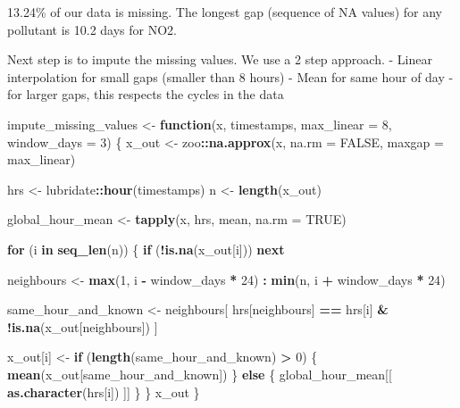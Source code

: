 \documentclass[
]{article}
\newenvironment{Shaded}{\begin{snugshade}}{\end{snugshade}}
\newcommand{\AttributeTok}[1]{\textcolor[rgb]{0.13,0.29,0.53}{#1}}
\newcommand{\ConstantTok}[1]{\textcolor[rgb]{0.56,0.35,0.01}{#1}}
\newcommand{\ControlFlowTok}[1]{\textcolor[rgb]{0.13,0.29,0.53}{\textbf{#1}}}
\newcommand{\DecValTok}[1]{\textcolor[rgb]{0.00,0.00,0.81}{#1}}
\newcommand{\FunctionTok}[1]{\textcolor[rgb]{0.13,0.29,0.53}{\textbf{#1}}}
\newcommand{\NormalTok}[1]{#1}
\newcommand{\OtherTok}[1]{\textcolor[rgb]{0.56,0.35,0.01}{#1}}
\newcommand{\SpecialCharTok}[1]{\textcolor[rgb]{0.81,0.36,0.00}{\textbf{#1}}}
\begin{document}
13.24\% of our data is missing. The longest gap (sequence of NA values)
for any pollutant is 10.2 days for NO2.

Next step is to impute the missing values. We use a 2 step approach. -
Linear interpolation for small gaps (smaller than 8 hours) - Mean for
same hour of day - for larger gaps, this respects the cycles in the data

\begin{Shaded}
\begin{Highlighting}[]
\NormalTok{impute\_missing\_values }\OtherTok{\textless{}{-}} \ControlFlowTok{function}\NormalTok{(x, timestamps, }\AttributeTok{max\_linear =} \DecValTok{8}\NormalTok{, }\AttributeTok{window\_days =} \DecValTok{3}\NormalTok{) \{}
\NormalTok{  x\_out }\OtherTok{\textless{}{-}}\NormalTok{ zoo}\SpecialCharTok{::}\FunctionTok{na.approx}\NormalTok{(x, }\AttributeTok{na.rm =} \ConstantTok{FALSE}\NormalTok{, }\AttributeTok{maxgap =}\NormalTok{ max\_linear)}

\NormalTok{  hrs }\OtherTok{\textless{}{-}}\NormalTok{ lubridate}\SpecialCharTok{::}\FunctionTok{hour}\NormalTok{(timestamps)}
\NormalTok{  n   }\OtherTok{\textless{}{-}} \FunctionTok{length}\NormalTok{(x\_out)}

\NormalTok{  global\_hour\_mean }\OtherTok{\textless{}{-}} \FunctionTok{tapply}\NormalTok{(x, hrs, mean, }\AttributeTok{na.rm =} \ConstantTok{TRUE}\NormalTok{)}

  \ControlFlowTok{for}\NormalTok{ (i }\ControlFlowTok{in} \FunctionTok{seq\_len}\NormalTok{(n)) \{}
    \ControlFlowTok{if}\NormalTok{ (}\SpecialCharTok{!}\FunctionTok{is.na}\NormalTok{(x\_out[i])) }\ControlFlowTok{next}

\NormalTok{    neighbours }\OtherTok{\textless{}{-}} \FunctionTok{max}\NormalTok{(}\DecValTok{1}\NormalTok{, i }\SpecialCharTok{{-}}\NormalTok{ window\_days }\SpecialCharTok{*} \DecValTok{24}\NormalTok{) }\SpecialCharTok{:} \FunctionTok{min}\NormalTok{(n, i }\SpecialCharTok{+}\NormalTok{ window\_days }\SpecialCharTok{*} \DecValTok{24}\NormalTok{)}

\NormalTok{    same\_hour\_and\_known }\OtherTok{\textless{}{-}}\NormalTok{ neighbours[}
\NormalTok{      hrs[neighbours] }\SpecialCharTok{==}\NormalTok{ hrs[i] }\SpecialCharTok{\&} \SpecialCharTok{!}\FunctionTok{is.na}\NormalTok{(x\_out[neighbours])}
\NormalTok{    ]}

\NormalTok{    x\_out[i] }\OtherTok{\textless{}{-}} \ControlFlowTok{if}\NormalTok{ (}\FunctionTok{length}\NormalTok{(same\_hour\_and\_known) }\SpecialCharTok{\textgreater{}} \DecValTok{0}\NormalTok{) \{}
      \FunctionTok{mean}\NormalTok{(x\_out[same\_hour\_and\_known]) }
\NormalTok{    \} }\ControlFlowTok{else}\NormalTok{ \{}
\NormalTok{      global\_hour\_mean[[ }\FunctionTok{as.character}\NormalTok{(hrs[i]) ]] }
\NormalTok{    \}}
\NormalTok{  \}}
\NormalTok{  x\_out}
\NormalTok{\}}


\end{Highlighting}
\end{Shaded}
\end{document}
